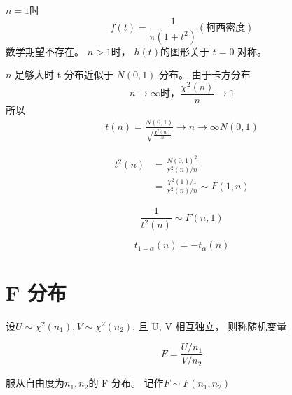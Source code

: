 \begin{corollary}[t 分布的概率密度函数]
    $n = 1$时 \begin{equation}f(t)=\frac{1}{\pi (1+t^2)}(柯西密度)\end{equation} 数学期望不存在。
    $n>1$时， $h(t)$的图形关于 $t=0$ 对称。
\end{corollary}

\begin{corollary}
    $n$ 足够大时 t 分布近似于 $N(0,1)$ 分布。 由于卡方分布
    \begin{equation}
        n\to \infty 时， \frac{\chi^2(n)}{n} \to 1
    \end{equation}
    所以
    \begin{equation}
        \begin{aligned}
            t(n) =
            {\frac{N(0,1)}{\sqrt{\frac{\chi^2(n)}{n}}}
            \rightarrow{n \to \infty}
            N(0,1)}
        \end{aligned}
    \end{equation}
\end{corollary}

\begin{corollary}[与 F 分布的关系]
    \begin{equation}
        \begin{aligned}
            t^2(n) & = \frac{N(0,1)^2}{\chi^2 (n)/n}                    \\
                   & = \frac{\chi ^2(1)/1}{ \chi ^2(n) / n} \sim F(1,n)
        \end{aligned}
    \end{equation}

    \begin{equation}
        \frac{1}{t^2(n)} \sim F(n,1)
    \end{equation}
\end{corollary}

\begin{definition}[t 分布的上分位点]
    \begin{equation}
        t_{1-\alpha} (n) = -t_\alpha(n)
    \end{equation}
\end{definition}

\section{F 分布}

\begin{definition}[F 分布]
    设$U \sim \chi^2(n_1), V \sim \chi^2(n_2)$, 且 U, V 相互独立， 则称随机变量

    \begin{equation}
        F = \frac{U/n_1}{V/n_2}
    \end{equation}

    服从自由度为$n_1,n_2$的 F 分布。 记作$F \sim F(n_1,n_2)$
\end{definition}

